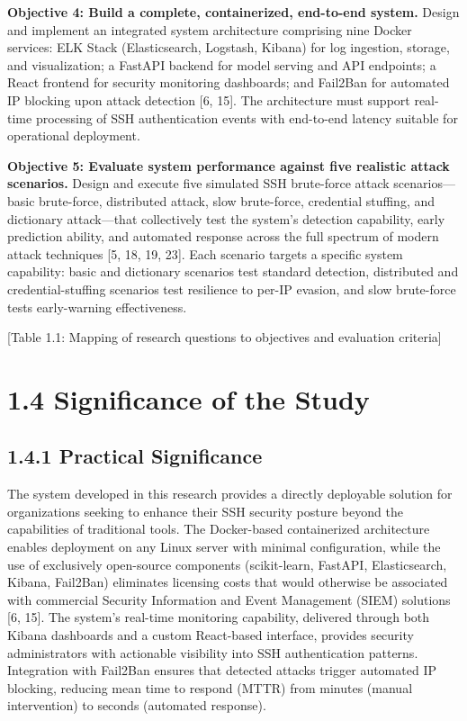\documentclass[
  a4paper]{report}
\begin{document}
\textbf{Objective 4: Build a complete, containerized, end-to-end
system.} Design and implement an integrated system architecture
comprising nine Docker services: ELK Stack (Elasticsearch, Logstash,
Kibana) for log ingestion, storage, and visualization; a FastAPI backend
for model serving and API endpoints; a React frontend for security
monitoring dashboards; and Fail2Ban for automated IP blocking upon
attack detection {[}6, 15{]}. The architecture must support real-time
processing of SSH authentication events with end-to-end latency suitable
for operational deployment.

\textbf{Objective 5: Evaluate system performance against five realistic
attack scenarios.} Design and execute five simulated SSH brute-force
attack scenarios---basic brute-force, distributed attack, slow
brute-force, credential stuffing, and dictionary attack---that
collectively test the system's detection capability, early prediction
ability, and automated response across the full spectrum of modern
attack techniques {[}5, 18, 19, 23{]}. Each scenario targets a specific
system capability: basic and dictionary scenarios test standard
detection, distributed and credential-stuffing scenarios test resilience
to per-IP evasion, and slow brute-force tests early-warning
effectiveness.

{[}Table 1.1: Mapping of research questions to objectives and evaluation
criteria{]}

\section{1.4 Significance of the Study}\label{significance-of-the-study}

\subsection{1.4.1 Practical Significance}\label{practical-significance}

The system developed in this research provides a directly deployable
solution for organizations seeking to enhance their SSH security posture
beyond the capabilities of traditional tools. The Docker-based
containerized architecture enables deployment on any Linux server with
minimal configuration, while the use of exclusively open-source
components (scikit-learn, FastAPI, Elasticsearch, Kibana, Fail2Ban)
eliminates licensing costs that would otherwise be associated with
commercial Security Information and Event Management (SIEM) solutions
{[}6, 15{]}. The system's real-time monitoring capability, delivered
through both Kibana dashboards and a custom React-based interface,
provides security administrators with actionable visibility into SSH
authentication patterns. Integration with Fail2Ban ensures that detected
attacks trigger automated IP blocking, reducing mean time to respond
(MTTR) from minutes (manual intervention) to seconds (automated
response).
\end{document}
